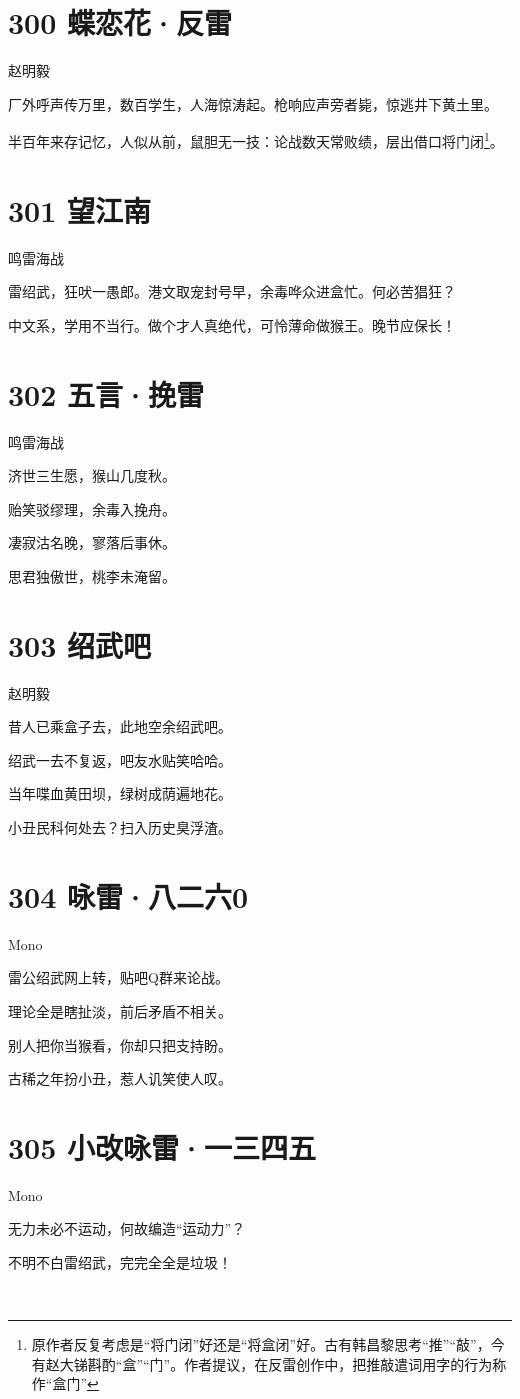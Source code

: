\documentclass[UTF8,12pt,oneside]{ctexbook}
\def\pau#1{\begin{center} {#1} \end{center}} %
\def\poem#1#2{\section{#1}\pau{#2}} %
\begin{document}
        \poem{300 蝶恋花·反雷}{赵明毅}

        厂外呼声传万里，数百学生，人海惊涛起。枪响应声旁者毙，惊逃井下黄土里。

        半百年来存记忆，人似从前，鼠胆无一技：论战数天常败绩，层出借口将门闭\footnote{原作者反复考虑是“将门闭”好还是“将盒闭”好。古有韩昌黎思考“推”“敲”，今有赵大锑斟酌“盒”“门”。作者提议，在反雷创作中，把推敲遣词用字的行为称作“盒门”}。

        \poem{301 望江南}{鸣雷海战}

            雷绍武，狂吠一愚郎。港文取宠封号早，余毒哗众进盒忙。何必苦猖狂？

            中文系，学用不当行。做个才人真绝代，可怜薄命做猴王。晚节应保长！

        \poem{302 五言·挽雷}{鸣雷海战}
        \begin{center}
            济世三生愿，猴山几度秋。

            贻笑驳缪理，余毒入挽舟。

            凄寂沽名晚，寥落后事休。

            思君独傲世，桃李未淹留。
        \end{center}

        \poem{303 绍武吧}{赵明毅}
        \begin{center}
            昔人已乘盒子去，此地空余绍武吧。

            绍武一去不复返，吧友水贴笑哈哈。

            当年喋血黄田坝，绿树成荫遍地花。

            小丑民科何处去？扫入历史臭浮渣。
        \end{center}

        \poem{304 咏雷·八二六0}{Mono}
        \begin{center}
            雷公绍武网上转，贴吧Q群来论战。
        
            理论全是瞎扯淡，前后矛盾不相关。
        
            别人把你当猴看，你却只把支持盼。
        
            古稀之年扮小丑，惹人讥笑使人叹。
        \end{center}

        \poem{305 小改咏雷·一三四五}{Mono}
        \begin{center}
            无力未必不运动，何故编造“运动力”？
            
            不明不白雷绍武，完完全全是垃圾！

            ~\\

        \end{center}
\end{document}
